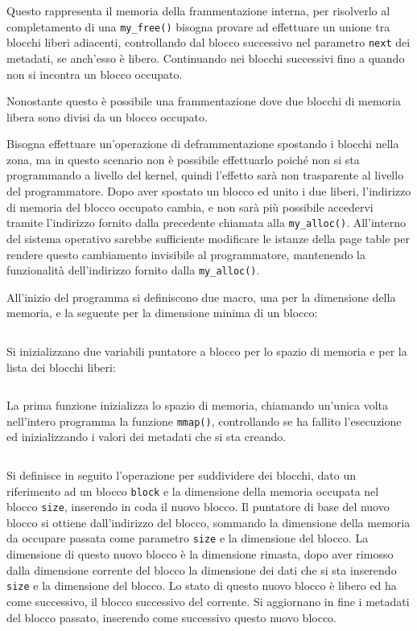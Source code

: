 \documentclass{article}
\numberwithin{equation}{subsection}
\begin{document}
Questo rappresenta il memoria della frammentazione interna, per risolverlo al completamento di 
una \verb|my_free()| bisogna provare ad effettuare un unione tra blocchi liberi adiacenti, controllando dal blocco successivo nel parametro \verb|next| dei metadati, se anch'esso è libero. Continuando nei blocchi successivi fino a quando non si incontra un blocco occupato. 

Nonostante questo è possibile una frammentazione dove due blocchi di memoria libera sono divisi 
da un blocco occupato. 

Bisogna effettuare un'operazione di deframmentazione spostando i blocchi nella zona, ma in questo 
scenario non è possibile effettuarlo poiché non si sta programmando a livello del kernel, quindi 
l'effetto sarà non trasparente al livello del programmatore. Dopo aver spostato un blocco 
ed unito i due liberi, l'indirizzo di memoria del blocco occupato cambia, e non sarà più possibile 
accedervi tramite l'indirizzo fornito dalla precedente chiamata alla \verb|my_alloc()|. All'interno del sistema operativo sarebbe sufficiente modificare le istanze della page table per 
rendere questo cambiamento invisibile al programmatore, mantenendo la funzionalità dell'indirizzo 
fornito dalla \verb|my_alloc()|. 


All'inizio del programma si definiscono due macro, una per la dimensione della memoria, e la seguente per la dimensione minima di un blocco: 
\inputminted[firstline=7,lastline=8]{c}{./"Esercitazione del 19-11-24"/domanda4.c}
Si inizializzano due variabili puntatore a blocco per lo spazio di memoria e per la lista 
dei blocchi liberi:
\inputminted[firstline=27,lastline=28]{c}{./"Esercitazione del 19-11-24"/domanda4.c}

La prima funzione inizializza lo spazio di memoria, chiamando un'unica volta nell'intero programma la funzione \verb|mmap()|, controllando se ha fallito l'esecuzione ed inizializzando 
i valori dei metadati che si sta creando. 
\inputminted[firstline=30,lastline=44]{c}{./"Esercitazione del 19-11-24"/domanda4.c}

Si definisce in seguito l'operazione per suddividere dei blocchi, dato un riferimento ad un blocco \verb|block| e la dimensione della memoria occupata nel blocco \verb|size|, inserendo in coda il nuovo blocco.  
Il puntatore di base del nuovo blocco si ottiene dall'indirizzo del blocco, sommando la dimensione della memoria da occupare passata come parametro \verb|size| e la dimensione del blocco. La dimensione di questo nuovo blocco è la dimensione rimasta, dopo aver rimosso dalla dimensione corrente del blocco la dimensione dei dati che si sta inserendo \verb|size| e la dimensione del blocco. Lo stato di questo nuovo blocco è libero ed ha come successivo, il blocco 
successivo del corrente. Si aggiornano in fine i metadati del blocco passato, inserendo come successivo questo nuovo blocco. 
\inputminted[firstline=47,lastline=56]{c}{./"Esercitazione del 19-11-24"/domanda4.c}
\end{document}
